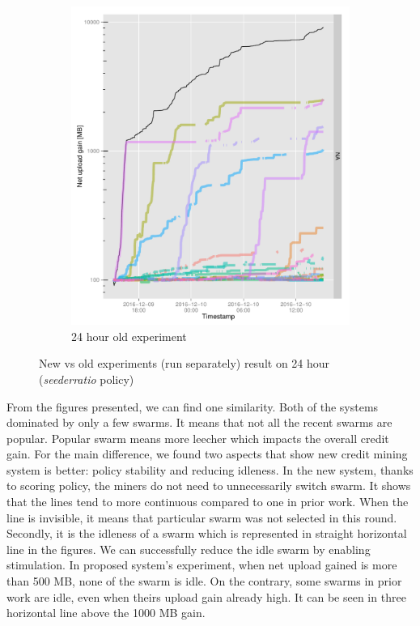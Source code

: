 \begin{figure}[h]
\begin{adjustwidth}{-1.5cm}{}
\begin{subfigure}[t]{0.6\textwidth}
			\includegraphics[width=\textwidth]{pics/results/m138.pdf}
			\caption{24 hour old experiment}
			\label{fig:oldetree24}
		\end{subfigure}
		\caption{New vs old experiments (run separately) result on 24 hour (\textit{seederratio} policy)}
	\end{adjustwidth}
\end{figure}
From the figures presented, we can find one similarity. Both of the systems dominated by only a few swarms. It means that not all the recent swarms are popular. Popular swarm means more leecher which impacts the overall credit gain. For the main difference, we found two aspects that show new credit mining system is better: policy stability and reducing idleness. In the new system, thanks to scoring policy, the miners do not need to unnecessarily switch swarm. It shows that the lines tend to more continuous compared to one in prior work. When the line is invisible, it means that particular swarm was not selected in this round. Secondly, it is the idleness of a swarm which is represented in straight horizontal line in the figures. We can successfully reduce the idle swarm by enabling stimulation. In proposed system's experiment, when net upload gained is more than 500 MB, none of the swarm is idle. On the contrary, some swarms in prior work are idle, even when theirs upload gain already high. It can be seen in three horizontal line above the 1000 MB gain.

